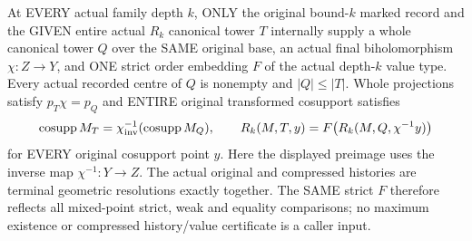 \begin{theorem}
\label{hir:original-finite-family-empty-free-canonical-compression}
\leanok
At EVERY actual family depth $k$, ONLY the original bound-$k$ marked record
and the GIVEN entire actual $R_k$ canonical tower $T$ internally supply a
whole canonical tower $Q$ over the SAME original base, an actual final
biholomorphism $\chi:Z\to Y$, and ONE strict order embedding $F$ of the
actual depth-$k$ value type. Every actual recorded centre of $Q$ is
nonempty and $|Q|\leq|T|$. Whole projections satisfy $p_T\chi=p_Q$ and
ENTIRE original transformed cosupport satisfies
\[
 \operatorname{cosupp}M_T=\chi^{-1}_{\rm inv}
   (\operatorname{cosupp}M_Q),\qquad
 R_k(M,T,y)=F\bigl(R_k(M,Q,\chi^{-1}y)\bigr)
\]
for EVERY original cosupport point $y$. Here the displayed preimage uses
the inverse map $\chi^{-1}:Y\to Z$. The actual original and compressed
histories are terminal geometric resolutions exactly together. The SAME
strict $F$ therefore reflects all mixed-point strict, weak and equality
comparisons; no maximum existence or compressed history/value certificate
is a caller input.
\end{theorem}
